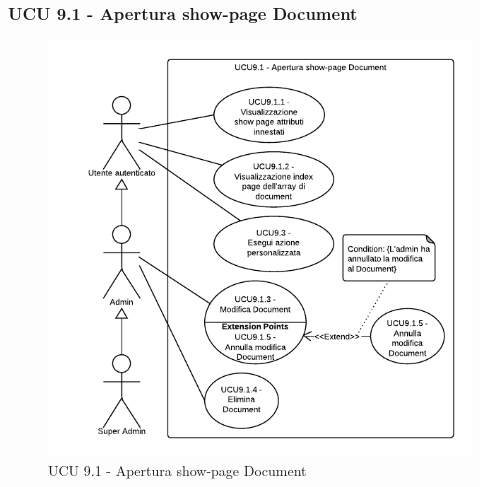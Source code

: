 \subsubsection{UCU 9.1 - Apertura show-page Document}    
    \begin{figure}[H]
      \begin{center}
      \includegraphics[width=12cm]{UML/UCU 9.1 - Apertura show-page Document.png}
      \caption{UCU 9.1 - Apertura show-page Document}
      \end{center} 
    \end{figure}    
    
